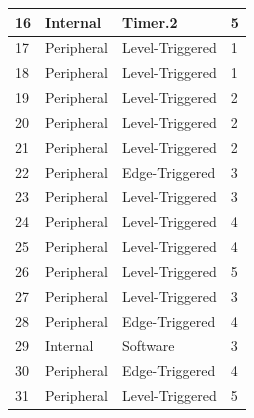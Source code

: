 \begin{longtable}[c]{ |p{1.5cm}|p{4.5cm}|p{4.5cm}|p{4.5cm}| }
    \hline
    16  & Internal      & Timer.2           & 5                 \\
    \hline
    17  & Peripheral    & Level-Triggered   & 1                 \\
    \hline
    18  & Peripheral    & Level-Triggered   & 1                 \\
    \hline
    19  & Peripheral    & Level-Triggered   & 2                 \\
    \hline
    20  & Peripheral    & Level-Triggered   & 2                 \\
    \hline
    21  & Peripheral    & Level-Triggered   & 2                 \\
    \hline
    22  & Peripheral    & Edge-Triggered    & 3                 \\
    \hline
    23  & Peripheral    & Level-Triggered   & 3                 \\
    \hline
    24  & Peripheral    & Level-Triggered   & 4                 \\
    \hline
    25  & Peripheral    & Level-Triggered   & 4                 \\
    \hline
    26  & Peripheral    & Level-Triggered   & 5                 \\
    \hline
    27  & Peripheral    & Level-Triggered   & 3                 \\
    \hline
    28  & Peripheral    & Edge-Triggered    & 4                 \\
    \hline
    29  & Internal      & Software          & 3                 \\
    \hline
    30  & Peripheral    & Edge-Triggered    & 4                 \\
    \hline
    31  & Peripheral    & Level-Triggered   & 5                 \\

\end{longtable}
